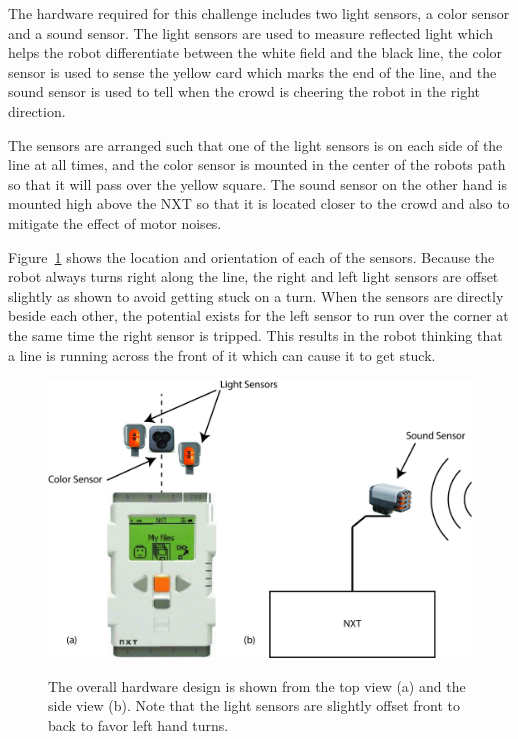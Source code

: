 \documentclass[journal]{../IEEEtran}
\begin{document}
The hardware required for this challenge includes two light sensors, a color sensor and a sound sensor. The light sensors are used to measure reflected light which helps the robot differentiate between the white field and the black line, the color sensor is used to sense the yellow card which marks the end of the line, and the sound sensor is used to tell when the crowd is cheering the robot in the right direction. 

The sensors are arranged such that one of the light sensors is on each side of the line at all times, and the color sensor is mounted in the center of the robots path so that it will pass over the yellow square. The sound sensor on the other hand is mounted high above the NXT so that it is located closer to the crowd and also to mitigate the effect of motor noises.

Figure~\ref{F.hardware} shows the location and orientation of each of the sensors. Because the robot always turns right along the line, the right and left light sensors are offset slightly as shown to avoid getting stuck on a turn. When the sensors are directly beside each other, the potential exists for the left sensor to run over the corner at the same time the right sensor is tripped. This results in the robot thinking that a line is running across the front of it which can cause it to get stuck.

\begin{figure}[ht]
 \centering
  \includegraphics[width=1\columnwidth]{hardware.jpg}\\
  \caption{The overall hardware design is shown from the top view (a) and the side view (b). Note that the light sensors are slightly offset front to back to favor left hand turns.}
  \label{F.hardware}
\end{figure}
\end{document}
